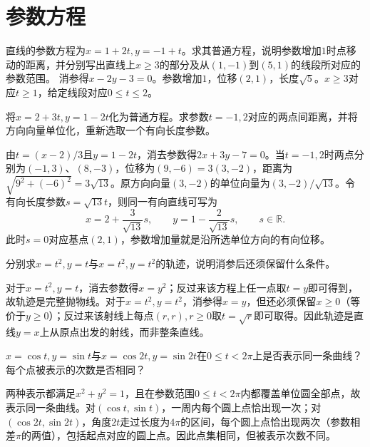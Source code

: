 \par\addvspace{12pt}

\section{参数方程}

直线的参数方程为\(x=1+2t,y=-1+t\)。求其普通方程，说明参数增加\(1\)时点移动的距离，并分别写出直线上\(x\ge3\)的部分及从\((1,-1)\)到\((5,1)\)的线段所对应的参数范围。
\solutionanswer
消参得\(x-2y-3=0\)。参数增加\(1\)，位移\((2,1)\)，长度\(\sqrt5\)。\(x\ge3\)对应\(t\ge1\)，给定线段对应\(0\le t\le2\)。


将\(x=2+3t,y=1-2t\)化为普通方程。求参数\(t=-1,2\)对应的两点间距离，并将方向向量单位化，重新选取一个有向长度参数。
\par
\solutionanswer
由\(t=(x-2)/3\)且\(y=1-2t\)，消去参数得\(2x+3y-7=0\)。当\(t=-1,2\)时两点分别为\((-1,3)\)、\((8,-3)\)，位移为\((9,-6)=3(3,-2)\)，距离为\(\sqrt{9^2+(-6)^2}=3\sqrt{13}\)。原方向向量\((3,-2)\)的单位向量为\((3,-2)/\sqrt{13}\)。令有向长度参数\(s=\sqrt{13}t\)，则同一有向直线可写为
\[x=2+\frac{3}{\sqrt{13}}s,\qquad y=1-\frac{2}{\sqrt{13}}s,\qquad s\in\mathbb R.\]
此时\(s=0\)对应基点\((2,1)\)，参数增加量就是沿所选单位方向的有向位移。


分别求\(x=t^2,y=t\)与\(x=t^2,y=t^2\)的轨迹，说明消参后还须保留什么条件。
\par
\solutionanswer
对于\(x=t^2,y=t\)，消去参数得\(x=y^2\)；反过来该方程上任一点取\(t=y\)即可得到，故轨迹是完整抛物线。对于\(x=t^2,y=t^2\)，消参得\(x=y\)，但还必须保留\(x\ge0\)（等价于\(y\ge0\)）；反过来该射线上每点\((r,r),r\ge0\)取\(t=\sqrt r\)即可取得。因此轨迹是直线\(y=x\)上从原点出发的射线，而非整条直线。


\(x=\cos t,y=\sin t\)与\(x=\cos2t,y=\sin2t\)在\(0\le t<2\pi\)上是否表示同一条曲线？每个点被表示的次数是否相同？
\par
\solutionanswer
两种表示都满足\(x^2+y^2=1\)，且在参数范围\(0\le t<2\pi\)内都覆盖单位圆全部点，故表示同一条曲线。对\((\cos t,\sin t)\)，一周内每个圆上点恰出现一次；对\((\cos2t,\sin2t)\)，角度\(2t\)走过长度为\(4\pi\)的区间，每个圆上点恰出现两次（参数相差\(\pi\)的两值），包括起点对应的圆上点。因此点集相同，但被表示次数不同。


